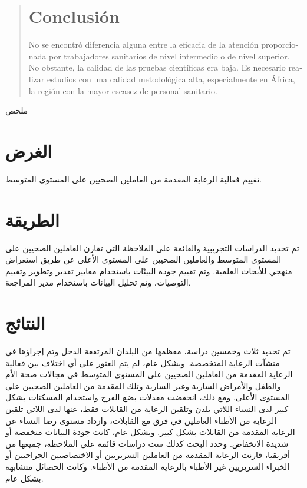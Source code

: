 \documentclass{article}
\begin{document}
\begin{otherlanguage}{spanish}
\begin{abstract}
\section{Conclusión}

No se encontró diferencia alguna entre la eficacia de la atención proporcionada
por
trabajadores sanitarios de nivel intermedio o de nivel superior. No obstante, la
calidad de las
pruebas científicas era baja. Es necesario realizar estudios con una calidad
metodológica
alta, especialmente en África, la región con la mayor escasez de personal
sanitario.

\end{abstract}
\end{otherlanguage}
\endgroup
ملخص\section{الغرض}

تقييم فعالية
الرعاية
المقدمة من
العاملين
الصحيين على
المستوى
المتوسط.

\section{الطريقة}

تم تحديد
الدراسات
التجريبية
والقائمة على
الملاحظة التي
تقارن
العاملين
الصحيين على
المستوى
المتوسط
والعاملين
الصحيين على
المستوى
الأعلى عن طريق
استعراض منهجي
للأبحاث
العلمية. وتم
تقييم جودة
البينّات
باستخدام
معايير تقدير
وتطوير وتقييم
التوصيات، وتم
تحليل
البيانات
باستخدام مدير
المراجعة.

\section{النتائج}

تم تحديد ثلاث
وخمسين دراسة،
معظمها من
البلدان
المرتفعة
الدخل وتم
إجراؤها في
منشآت الرعاية
المتخصصة.
وبشكل عام، لم
يتم العثور على
أي اختلاف بين
فعالية
الرعاية
المقدمة من
العاملين
الصحيين على
المستوى
المتوسط في
مجالات صحة
الأم والطفل
والأمراض
السارية وغير
السارية وتلك
المقدمة من
العاملين
الصحيين على
المستوى
الأعلى. ومع
ذلك، انخفضت
معدلات بضع
الفرج
واستخدام
المسكنات بشكل
كبير لدى
النساء اللاتي
يلدن وتلقين
الرعاية من
القابلات فقط،
عنها لدى
اللاتي تلقين
الرعاية من
الأطباء
العاملين في
فرق مع
القابلات،
وازداد مستوى
رضا النساء عن
الرعاية
المقدمة من
القابلات بشكل
كبير. وبشكل
عام، كانت جودة
البيانات
منخفضة أو
شديدة
الانخفاض. وحدد
البحث كذلك ست
دراسات قائمة
على الملاحظة،
جميعها من
أفريقيا،
قارنت الرعاية
المقدمة من
العاملين
السريريين أو
الاختصاصيين
الجراحيين أو
الخبراء
السريريين غير
الأطباء
بالرعاية
المقدمة من
الأطباء. وكانت
الحصائل
متشابهة بشكل
عام.
\end{document}
